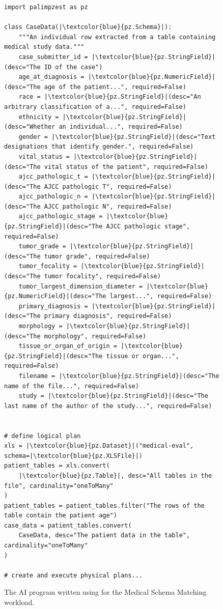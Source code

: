 \begin{figure}
  \centering %
  \begin{verbatim}
import palimpzest as pz

class CaseData(|\textcolor{blue}{pz.Schema}|):
    """An individual row extracted from a table containing medical study data."""
    case_submitter_id = |\textcolor{blue}{pz.StringField}|(desc="The ID of the case")
    age_at_diagnosis = |\textcolor{blue}{pz.NumericField}|(desc="The age of the patient...", required=False)
    race = |\textcolor{blue}{pz.StringField}|(desc="An arbitrary classification of a...", required=False)
    ethnicity = |\textcolor{blue}{pz.StringField}|(desc="Whether an individual...", required=False)
    gender = |\textcolor{blue}{pz.StringField}|(desc="Text designations that identify gender.", required=False)
    vital_status = |\textcolor{blue}{pz.StringField}|(desc="The vital status of the patient", required=False)
    ajcc_pathologic_t = |\textcolor{blue}{pz.StringField}|(desc="The AJCC pathologic T", required=False)
    ajcc_pathologic_n = |\textcolor{blue}{pz.StringField}|(desc="The AJCC pathologic N", required=False)
    ajcc_pathologic_stage = |\textcolor{blue}{pz.StringField}|(desc="The AJCC pathologic stage", required=False)
    tumor_grade = |\textcolor{blue}{pz.StringField}|(desc="The tumor grade", required=False)
    tumor_focality = |\textcolor{blue}{pz.StringField}|(desc="The tumor focality", required=False)
    tumor_largest_dimension_diameter = |\textcolor{blue}{pz.NumericField}|(desc="The largest...", required=False)
    primary_diagnosis = |\textcolor{blue}{pz.StringField}|(desc="The primary diagnosis", required=False)
    morphology = |\textcolor{blue}{pz.StringField}|(desc="The morphology", required=False)
    tissue_or_organ_of_origin = |\textcolor{blue}{pz.StringField}|(desc="The tissue or organ...", required=False)
    filename = |\textcolor{blue}{pz.StringField}|(desc="The name of the file...", required=False)
    study = |\textcolor{blue}{pz.StringField}|(desc="The last name of the author of the study...", required=False)


# define logical plan
xls = |\textcolor{blue}{pz.Dataset}|("medical-eval", schema=|\textcolor{blue}{pz.XLSFile}|)
patient_tables = xls.convert(
    |\textcolor{blue}{pz.Table}|, desc="All tables in the file", cardinality="oneToMany"
)
patient_tables = patient_tables.filter("The rows of the table contain the patient age")
case_data = patient_tables.convert(
    CaseData, desc="The patient data in the table", cardinality="oneToMany"
)

# create and execute physical plans...
    \end{verbatim}
  \caption{The AI program written using \system{} for the Medical Schema Matching workload. 
  }
  \label{fig:medical-schema-matching-program}
\end{figure}

